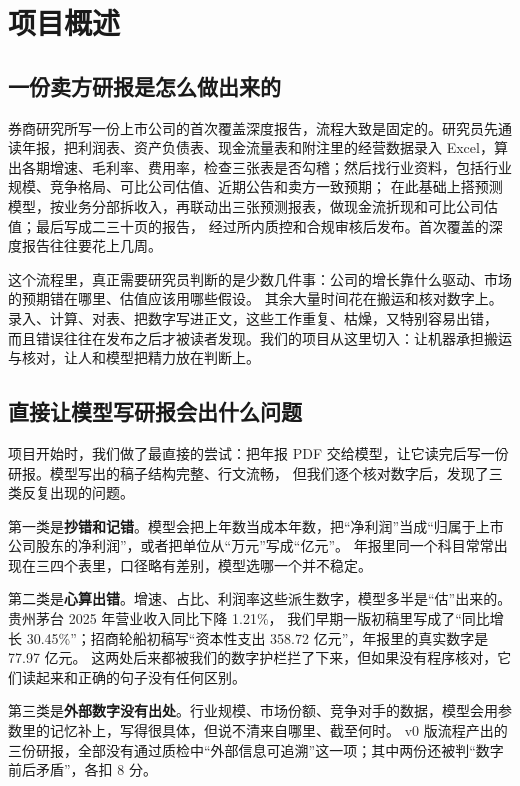 \chapter{项目概述}

\section{一份卖方研报是怎么做出来的}

券商研究所写一份上市公司的首次覆盖深度报告，流程大致是固定的。研究员先通读年报，把利润表、资产负债表、现金流量表和附注里的经营数据录入
Excel，算出各期增速、毛利率、费用率，检查三张表是否勾稽；然后找行业资料，包括行业规模、竞争格局、可比公司估值、近期公告和卖方一致预期；
在此基础上搭预测模型，按业务分部拆收入，再联动出三张预测报表，做现金流折现和可比公司估值；最后写成二三十页的报告，
经过所内质控和合规审核后发布。首次覆盖的深度报告往往要花上几周。

这个流程里，真正需要研究员判断的是少数几件事：公司的增长靠什么驱动、市场的预期错在哪里、估值应该用哪些假设。
其余大量时间花在搬运和核对数字上。录入、计算、对表、把数字写进正文，这些工作重复、枯燥，又特别容易出错，
而且错误往往在发布之后才被读者发现。我们的项目从这里切入：让机器承担搬运与核对，让人和模型把精力放在判断上。

\section{直接让模型写研报会出什么问题}

项目开始时，我们做了最直接的尝试：把年报 PDF 交给模型，让它读完后写一份研报。模型写出的稿子结构完整、行文流畅，
但我们逐个核对数字后，发现了三类反复出现的问题。

第一类是\textbf{抄错和记错}。模型会把上年数当成本年数，把“净利润”当成“归属于上市公司股东的净利润”，或者把单位从“万元”写成“亿元”。
年报里同一个科目常常出现在三四个表里，口径略有差别，模型选哪一个并不稳定。

第二类是\textbf{心算出错}。增速、占比、利润率这些派生数字，模型多半是“估”出来的。贵州茅台 2025 年营业收入同比下降 1.21\%，
我们早期一版初稿里写成了“同比增长 30.45\%”；招商轮船初稿写“资本性支出 358.72 亿元”，年报里的真实数字是 77.97 亿元。
这两处后来都被我们的数字护栏拦了下来，但如果没有程序核对，它们读起来和正确的句子没有任何区别。

第三类是\textbf{外部数字没有出处}。行业规模、市场份额、竞争对手的数据，模型会用参数里的记忆补上，写得很具体，但说不清来自哪里、截至何时。
v0 版流程产出的三份研报，全部没有通过质检中“外部信息可追溯”这一项；其中两份还被判“数字前后矛盾”，各扣 8 分。


